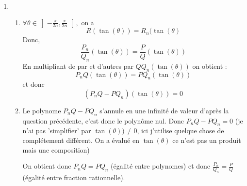 \begin{correction}
\begin{enumerate}
\begin{enumerate}
\end{enumerate}
\item
\begin{enumerate}
\item $\forall  \theta \in \left] -\frac{\pi}{2n},\frac{\pi}{2n}\right[, $
on a 
$$R(\tan(\theta)) =R_n(\tan(\theta)$$
Donc, 
$$\frac{P_n}{Q_n} (\tan(\theta)) =\frac{P}{Q} (\tan(\theta))$$
En multipliant de par et d'autres par $QQ_n (\tan(\theta))$ on obtient : 
$$P_n Q (\tan(\theta))=P Q_n (\tan(\theta))$$
et donc 
$$(P_nQ -PQ_n)(\tan(\theta))=0$$
\item Le polynome $P_nQ -PQ_n$  s'annule en une infinité de valeur d'après la question précédente, c'est donc le polynôme nul. Donc 
$P_n Q - P Q_n = 0$ (je n'ai pas 'simplifier' par $\tan(\theta)) \neq 0$, ici j'utilise quelque chose de complétement différent. On a évalué en $\tan(\theta)$ ce n'est pas un produit mais une composition) 

On obtient donc $P_n Q= PQ_n$ (égalité entre polynomes) et donc 
$\frac{P_n}{Q_n} =\frac{P}{Q}$ (égalité entre fraction rationnelle). 

\end{enumerate}
\end{enumerate}
\end{correction}